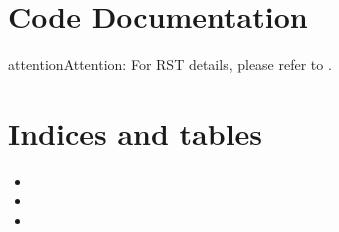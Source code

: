 \documentclass[letterpaper,10pt,english]{sphinxmanual}
\begin{document}
\sphinxstepscope


\chapter{Code Documentation}
\label{\detokenize{docs/ShavitFrancezAlg/code:code-documentation}}\label{\detokenize{docs/ShavitFrancezAlg/code::doc}}

\begin{savenotes}\sphinxattablestart
\sphinxthistablewithglobalstyle
\sphinxthistablewithnovlinesstyle
\centering
\begin{tabulary}{\linewidth}[t]{}
\sphinxtoprule
\sphinxtableatstartofbodyhook\sphinxbottomrule
\end{tabulary}
\sphinxtableafterendhook\par
\sphinxattableend\end{savenotes}

\begin{sphinxadmonition}{attention}{Attention:}
\sphinxAtStartPar
For RST details, please refer to .
\end{sphinxadmonition}


\chapter{Indices and tables}
\label{\detokenize{index:indices-and-tables}}\begin{itemize}
\item {} 
\sphinxAtStartPar
{}

\item {} 
\sphinxAtStartPar
{}

\item {} 
\sphinxAtStartPar
{}

\end{itemize}
\end{document}

